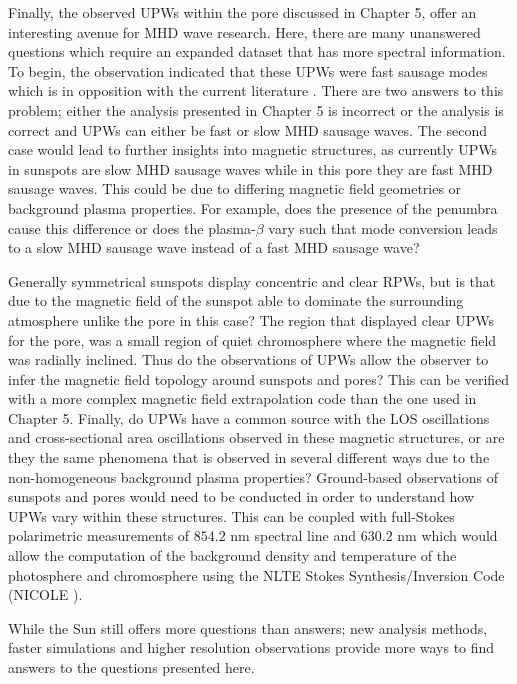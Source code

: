 	Finally, the observed UPWs within the pore discussed in Chapter 5, offer an interesting avenue for MHD wave research.
	Here, there are many unanswered questions which require an expanded dataset that has more spectral information.
	To begin, the observation indicated that these UPWs were fast sausage modes which is in opposition with the current literature \citep{Bloomfiel2008,Jess2013}.
	There are two answers to this problem; either the analysis presented in Chapter 5 is incorrect or the analysis is correct and UPWs can either be fast or slow MHD sausage waves.
	The second case would lead to further insights into magnetic structures, as currently UPWs in sunspots are slow MHD sausage waves while in this pore they are fast MHD sausage waves.
	This could be due to differing magnetic field geometries or background plasma properties.
	For example, does the presence of the penumbra cause this difference or does the plasma-$\beta$ vary such that mode conversion leads to a slow MHD sausage wave instead of a fast MHD sausage wave?
	
	Generally symmetrical sunspots display concentric and clear RPWs, but is that due to the magnetic field of the sunspot able to dominate the surrounding atmosphere unlike the pore in this case?
	The region that displayed clear UPWs for the pore, was a small region of quiet chromosphere where the magnetic field was radially inclined.
	Thus do the observations of UPWs allow the observer to infer the magnetic field topology around sunspots and pores?
	This can be verified with a more complex magnetic field extrapolation code than the one used in Chapter 5.
	Finally, do UPWs have a common source with the LOS oscillations and cross-sectional area oscillations observed in these magnetic structures, or are they the same phenomena that is observed in several different ways due to the non-homogeneous background plasma properties?
	Ground-based observations of sunspots and pores would need to be conducted in order to understand how UPWs vary within these structures.
	This can be coupled with full-Stokes polarimetric measurements of  $854.2$ nm spectral line and  $630.2$ nm which would allow the computation of the background density and temperature of the photosphere and chromosphere using the NLTE Stokes Synthesis/Inversion Code
	(NICOLE \citealt{2015A&A...577A...7S,2015ApJ...798..100B}).
	
	While the Sun still offers more questions than answers; new analysis methods, faster simulations and higher resolution observations provide more ways to find answers to the questions presented here.